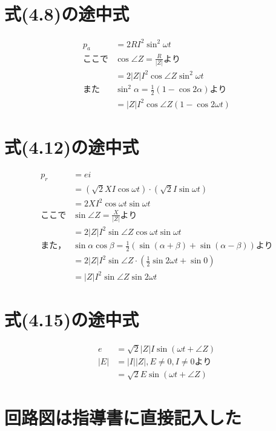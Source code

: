 \documentclass[11pt,dvipdfmx]{ujarticle}
\begin{document}
\section{式(4.8)の途中式}
\begin{align*}
	p_{a}&=2RI^{2}\sin ^{2} \omega t\\
	ここで&\cos \angle Z=\frac{R}{|Z|}より\\
	&=2|Z|I^{2}\cos \angle Z\sin ^{2} \omega t\\
	また&\sin ^{2} \alpha =\frac{1}{2}\left(1-\cos 2 \alpha\right)より\\
	&=|Z|I^{2}\cos \angle Z(1-\cos 2\omega t)
\end{align*}

\section{式(4.12)の途中式}
\begin{align*}
	p_{r}&=ei\\
	&=(\sqrt{2}XI\cos \omega t) \cdot (\sqrt{2}I\sin \omega t)\\
	&=2XI^{2}\cos \omega t \sin \omega t\\
	ここで&\sin \angle Z=\frac{X}{|Z|}より\\
	&=2|Z|I^{2}\sin \angle Z\cos \omega t \sin \omega t\\
	また，&\sin \alpha \cos \beta=\frac{1}{2}\left(\sin (\alpha +\beta)+\sin (\alpha -\beta)\right)より\\
	&=2|Z|I^{2}\sin \angle Z \cdot \left(\frac{1}{2}\sin 2 \omega t+\sin 0\right)\\
	&=|Z|I^{2}\sin \angle Z \sin 2\omega t
\end{align*}

\section{式(4.15)の途中式}
\begin{align*}
	e&=\sqrt{2}|Z|I\sin (\omega t +\angle Z)\\
	|E|&=|I||Z|, E\neq 0, I\neq 0より\\
	&=\sqrt{2}E\sin (\omega t +\angle Z)
\end{align*}

\section{回路図は指導書に直接記入した}
\printbibliography[title=参考文献]
\end{document}

